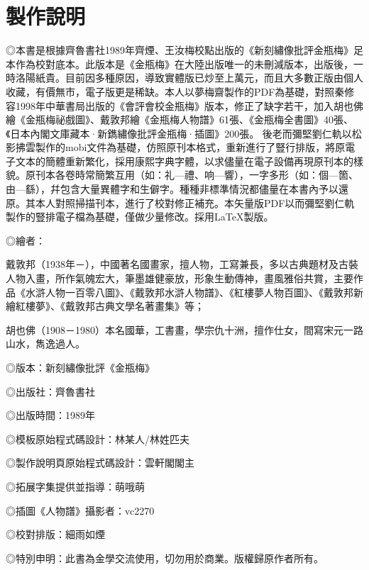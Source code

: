 \chapter*{製作說明}


◎本書是根據齊魯書社1989年齊煙、王汝梅校點出版的《新刻繡像批評金瓶梅》足本作為校對底本。此版本是《金瓶梅》在大陸出版唯一的未刪減版本，出版後，一時洛陽紙貴。目前因多種原因，導致實體版已炒至上萬元，而且大多數正版由個人收藏，有價無市，電子版更是稀缺。本人以夢梅齋製作的PDF為基礎，對照秦修容1998年中華書局出版的《會評會校金瓶梅》版本，修正了缺字若干，加入胡也佛繪《金瓶梅祕戲圖》、戴敦邦繪《金瓶梅人物譜》61張、《金瓶梅全書圖》40張、《日本內閣文庫藏本·新鐫繡像批評金瓶梅·插圖》200張。
後老而彌堅劉仁軌以松影拂雲製作的mobi文件為基礎，仿照原刊本格式，重新進行了豎行排版，將原電子文本的簡體重新繁化，採用康熙字典字體，以求儘量在電子設備再現原刊本的樣貌。原刊本各卷時常簡繁互用（如：礼—禮、响—響），一字多形（如：個—箇、由—繇），幷包含大量異體字和生僻字。種種非標準情況都儘量在本書內予以還原。其本人對照掃描刊本，進行了校對修正補充。本矢量版PDF以而彌堅劉仁軌製作的豎排電子檔為基礎，僅做少量修改。採用{\LaTeX}製版。

◎繪者：

戴敦邦（1938年－），中國著名國畫家，擅人物，工寫兼長，多以古典題材及古裝人物入畫，所作氣魄宏大，筆墨雄健豪放，形象生動傳神，畫風雅俗共賞，主要作品《水滸人物一百零八圖》、《戴敦邦水滸人物譜》、《紅樓夢人物百圖》、《戴敦邦新繪紅樓夢》、《戴敦邦古典文學名著畫集》等；

胡也佛（1908－1980）本名國華，工書畫，學宗仇十洲，擅作仕女，間寫宋元一路山水，雋逸過人。

◎版本：新刻繡像批評《金瓶梅》

◎出版社：齊魯書社

◎出版時間：1989年

◎模板原始程式碼設計：林某人/林姓匹夫

◎製作說明頁原始程式碼設計：雲軒閣閣主

◎拓展字集提供並指導：萌哦萌

◎插圖《人物譜》攝影者：vc2270

◎校對排版：細雨如煙

◎特別申明：此書為金學交流使用，切勿用於商業。版權歸原作者所有。

\begin{quotation}
\raggedleft\small\kaishu\color{gray}{庚子歲正月製書於米國山景城}
\end{quotation}

{\insertauthorlogo}